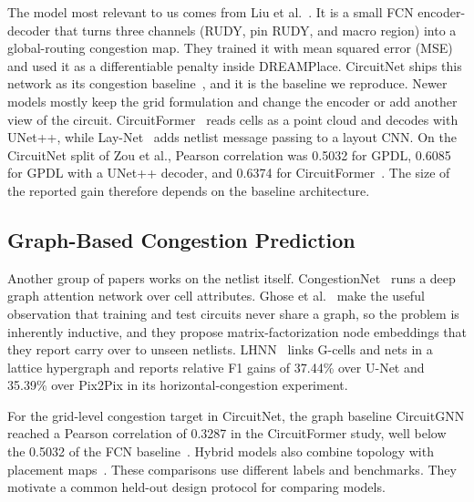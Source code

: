 \IfFileExists{./ieeeconf.cls}{\documentclass[9pt]{ieeeconf}}{\documentclass[conference]{IEEEtran}\usepackage[T1]{fontenc}}
\begin{document}
The model most relevant to us comes from Liu et al.~\cite{liu2021global}. It is a small FCN encoder-decoder that turns three channels (RUDY, pin RUDY, and macro region) into a global-routing congestion map. They trained it with mean squared error (MSE) and used it as a differentiable penalty inside DREAMPlace. CircuitNet ships this network as its congestion baseline~\cite{chai2023circuitnet}, and it is the baseline we reproduce. Newer models mostly keep the grid formulation and change the encoder or add another view of the circuit. CircuitFormer~\cite{zou2023circuitformer} reads cells as a point cloud and decodes with UNet++, while Lay-Net~\cite{zheng2023laynet} adds netlist message passing to a layout CNN. On the CircuitNet split of Zou et al., Pearson correlation was 0.5032 for GPDL, 0.6085 for GPDL with a UNet++ decoder, and 0.6374 for CircuitFormer~\cite{zou2023circuitformer}. The size of the reported gain therefore depends on the baseline architecture.

\subsection{Graph-Based Congestion Prediction}
Another group of papers works on the netlist itself. CongestionNet~\cite{kirby2019congestionnet} runs a deep graph attention network over cell attributes. Ghose et al.~\cite{ghose2021generalizable} make the useful observation that training and test circuits never share a graph, so the problem is inherently inductive, and they propose matrix-factorization node embeddings that they report carry over to unseen netlists. LHNN~\cite{wang2022lhnn} links G-cells and nets in a lattice hypergraph and reports relative F1 gains of 37.44\% over U-Net and 35.39\% over Pix2Pix in its horizontal-congestion experiment.

For the grid-level congestion target in CircuitNet, the graph baseline CircuitGNN reached a Pearson correlation of 0.3287 in the CircuitFormer study, well below the 0.5032 of the FCN baseline~\cite{zou2023circuitformer}. Hybrid models also combine topology with placement maps~\cite{zheng2023laynet}. These comparisons use different labels and benchmarks. They motivate a common held-out design protocol for comparing models.
\end{document}
